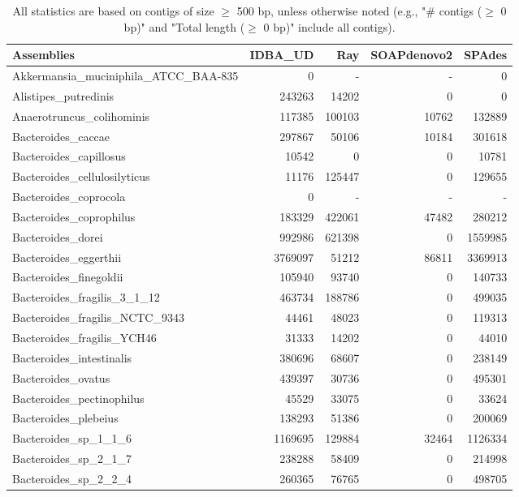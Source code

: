 \documentclass[12pt,a4paper]{article}
\begin{document}
\begin{table}[ht]
\begin{center}
\caption{All statistics are based on contigs of size $\geq$ 500 bp, unless otherwise noted (e.g., "\# contigs ($\geq$ 0 bp)" and "Total length ($\geq$ 0 bp)" include all contigs).}
\begin{tabular}{|l*{4}{|r}|}
\hline
Assemblies & IDBA\_UD & Ray & SOAPdenovo2 & SPAdes \\ \hline
Akkermansia\_muciniphila\_ATCC\_BAA-835 & 0 & - & - & 0 \\ \hline
Alistipes\_putredinis & 243263 & 14202 & 0 & 0 \\ \hline
Anaerotruncus\_colihominis & 117385 & 100103 & 10762 & 132889 \\ \hline
Bacteroides\_caccae & 297867 & 50106 & 10184 & 301618 \\ \hline
Bacteroides\_capillosus & 10542 & 0 & 0 & 10781 \\ \hline
Bacteroides\_cellulosilyticus & 11176 & 125447 & 0 & 129655 \\ \hline
Bacteroides\_coprocola & 0 & - & - & - \\ \hline
Bacteroides\_coprophilus & 183329 & 422061 & 47482 & 280212 \\ \hline
Bacteroides\_dorei & 992986 & 621398 & 0 & 1559985 \\ \hline
Bacteroides\_eggerthii & 3769097 & 51212 & 86811 & 3369913 \\ \hline
Bacteroides\_finegoldii & 105940 & 93740 & 0 & 140733 \\ \hline
Bacteroides\_fragilis\_3\_1\_12 & 463734 & 188786 & 0 & 499035 \\ \hline
Bacteroides\_fragilis\_NCTC\_9343 & 44461 & 48023 & 0 & 119313 \\ \hline
Bacteroides\_fragilis\_YCH46 & 31333 & 14202 & 0 & 44010 \\ \hline
Bacteroides\_intestinalis & 380696 & 68607 & 0 & 238149 \\ \hline
Bacteroides\_ovatus & 439397 & 30736 & 0 & 495301 \\ \hline
Bacteroides\_pectinophilus & 45529 & 33075 & 0 & 33624 \\ \hline
Bacteroides\_plebeius & 138293 & 51386 & 0 & 200069 \\ \hline
Bacteroides\_sp\_1\_1\_6 & 1169695 & 129884 & 32464 & 1126334 \\ \hline
Bacteroides\_sp\_2\_1\_7 & 238288 & 58409 & 0 & 214998 \\ \hline
Bacteroides\_sp\_2\_2\_4 & 260365 & 76765 & 0 & 498705 \\ \hline

\end{tabular}
\end{center}
\end{table}
\end{document}
